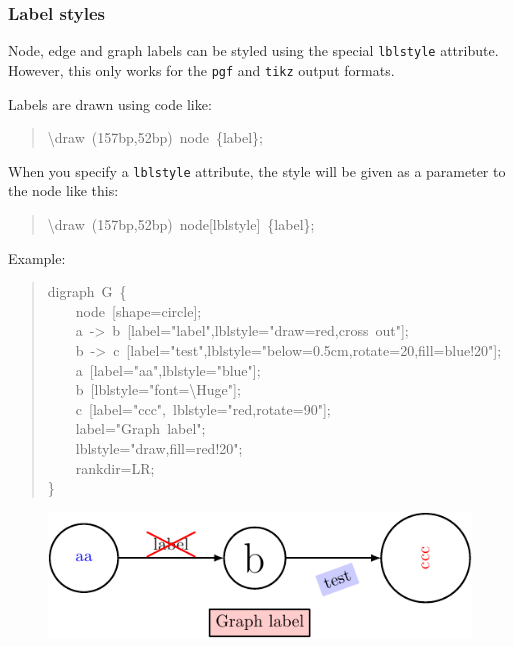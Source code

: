 \documentclass[10pt,a4paper,english]{article}
\begin{document}

\hypertarget{label-styles}{}
\subsubsection*{Label styles}
\label{label-styles}

Node, edge and graph labels can be styled using the special \texttt{lblstyle} attribute. However, this only works for the \texttt{pgf} and \texttt{tikz} output formats.

Labels are drawn using code like:
\begin{quote}{\ttfamily \raggedright \noindent
{\textbackslash}draw~(157bp,52bp)~node~{\{}label{\}};
}\end{quote}

When you specify a \texttt{lblstyle} attribute, the style will be given as a parameter to the node like this:
\begin{quote}{\ttfamily \raggedright \noindent
{\textbackslash}draw~(157bp,52bp)~node{[}lblstyle{]}~{\{}label{\}};
}\end{quote}

Example:
\begin{quote}{\ttfamily \raggedright \noindent
digraph~G~{\{}~\\
~~~~node~{[}shape=circle{]};~\\
~~~~a~->~b~{[}label="label",lblstyle="draw=red,cross~out"{]};~\\
~~~~b~->~c~{[}label="test",lblstyle="below=0.5cm,rotate=20,fill=blue!20"{]};~\\
~~~~a~{[}label="aa",lblstyle="blue"{]};~\\
~~~~b~{[}lblstyle="font={\textbackslash}Huge"{]};~\\
~~~~c~{[}label="ccc",~lblstyle="red,rotate=90"{]};~\\
~~~~label="Graph~label";~\\
~~~~lblstyle="draw,fill=red!20";~\\
~~~~rankdir=LR;~\\
{\}}
}\end{quote}
\begin{figure}[H]
\centering

\includegraphics{pdf/lblstyle}
\end{figure}
\end{document}
